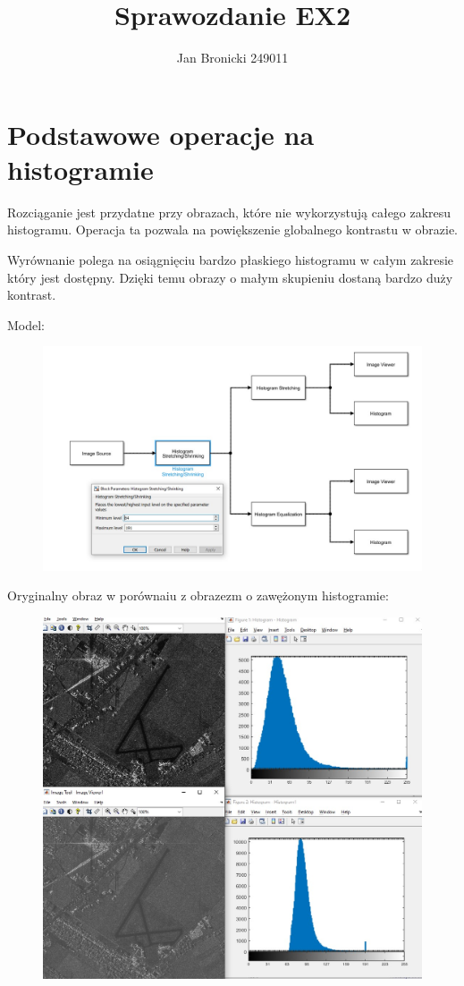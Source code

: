 \documentclass{article}
\title{Sprawozdanie EX2}
\author{Jan Bronicki 249011}
\date{}
\begin{document}
\maketitle

\section{Podstawowe operacje na histogramie}

Rozciąganie jest przydatne przy obrazach, które nie wykorzystują całego zakresu histogramu. Operacja ta pozwala na powiększenie globalnego kontrastu w obrazie.

Wyrównanie polega na osiągnięciu bardzo płaskiego histogramu w całym zakresie który jest dostępny. Dzięki temu obrazy o małym skupieniu dostaną bardzo duży kontrast.

Model:

\begin{figure}[h!]
    \centering
    \includegraphics[scale=0.5]{zad1_model.jpg}
\end{figure}

\newpage

Oryginalny obraz w porównaiu z obrazezm o zawężonym histogramie:
\begin{figure}[h!]
    \centering
    \includegraphics[scale=0.5]{zad1_bezeqsq.jpg}
\end{figure}
\end{document}
